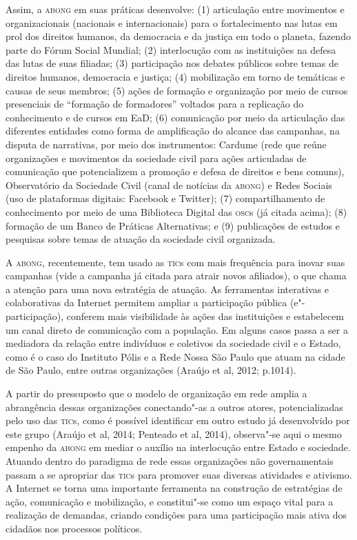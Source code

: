 Assim, a \textsc{abong} em suas práticas desenvolve: (1) articulação entre
movimentos e organizacionais (nacionais e internacionais) para o
fortalecimento nas lutas em prol dos direitos humanos, da democracia e
da justiça em todo o planeta, fazendo parte do Fórum Social Mundial; (2)
interlocução com as instituições na defesa das lutas de suas filiadas;
(3) participação nos debates públicos sobre temas de direitos humanos,
democracia e justiça; (4) mobilização em torno de temáticas e causas de
seus membros; (5) ações de formação e organização por meio de cursos
presenciais de ``formação de formadores'' voltados para a replicação do
conhecimento e de cursos em EaD; (6) comunicação por meio da articulação
das diferentes entidades como forma de amplificação do alcance das
campanhas, na disputa de narrativas, por meio dos instrumentos: Cardume
(rede que reúne organizações e movimentos da sociedade civil para ações
articuladas de comunicação que potencializem a promoção e defesa de
direitos e bens comuns), Observatório da Sociedade Civil (canal de
notícias da \textsc{abong}) e Redes Sociais (uso de plataformas digitais:
Facebook e Twitter); (7) compartilhamento de conhecimento por meio de
uma Biblioteca Digital das \textsc{osc}s (já citada acima); (8) formação de um
Banco de Práticas Alternativas; e (9) publicações de estudos e pesquisas
sobre temas de atuação da sociedade civil organizada.

A \textsc{abong}, recentemente, tem usado as \textsc{tic}s com mais frequência para inovar
suas campanhas (vide a campanha já citada para atrair novos afiliados),
o que chama a atenção para uma nova estratégia de atuação. As
ferramentas interativas e colaborativas da Internet permitem ampliar a
participação pública (e"-participação), conferem mais visibilidade às
ações das instituições e estabelecem um canal direto de comunicação com
a população. Em alguns casos passa a ser a mediadora da relação entre
indivíduos e coletivos da sociedade civil e o Estado, como é o caso do
Instituto Pólis e a Rede Nossa São Paulo que atuam na cidade de São
Paulo, entre outras organizações (Araújo et al, 2012; p.1014).

A partir do pressuposto que o modelo de organização em rede amplia a
abrangência dessas organizações conectando"-as a outros atores,
potencializadas pelo uso das \textsc{tic}s, como é possível identificar em outro
estudo já desenvolvido por este grupo (Araújo et al, 2014; Penteado et
al, 2014), observa"-se aqui o mesmo empenho da \textsc{abong} em mediar o auxílio
na interlocução entre Estado e sociedade. Atuando dentro do paradigma de
rede essas organizações não governamentais passam a se apropriar das
\textsc{tic}s para promover suas diversas atividades e ativismo. A Internet se
torna uma importante ferramenta na construção de estratégias de ação,
comunicação e mobilização, e constitui"-se como um espaço vital para a
realização de demandas, criando condições para uma participação mais
ativa dos cidadãos nos processos políticos.


